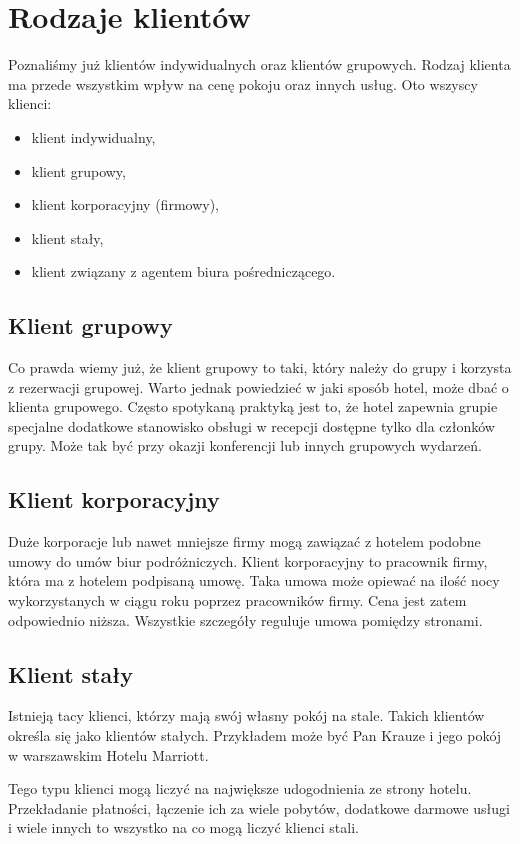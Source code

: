 \documentclass[a4paper,onecolumn,oneside,11pt,wide,floatssmall]{mwrep}
\theoremstyle{definition}
\theoremstyle{plain}%
\theoremstyle{remark}
\begin{document}
\section{Rodzaje klientów}
\label{rodzaje-klientow}
Poznaliśmy już klientów indywidualnych oraz klientów grupowych. Rodzaj 
klienta ma przede wszystkim wpływ na cenę pokoju oraz innych usług. Oto 
wszyscy klienci:

\begin{itemize}
  \item klient indywidualny,
  \item klient grupowy,
  \item klient korporacyjny (firmowy),
  \item klient stały,
  \item klient związany z agentem biura pośredniczącego.
\end{itemize}

\subsection{Klient grupowy}
Co prawda wiemy już, że klient grupowy to taki, który należy do grupy i 
korzysta z rezerwacji grupowej. Warto jednak powiedzieć w jaki sposób hotel, 
może dbać o klienta grupowego. Często spotykaną praktyką jest to, że hotel 
zapewnia grupie specjalne dodatkowe stanowisko obsługi w recepcji dostępne 
tylko dla członków grupy. Może tak być przy okazji konferencji lub innych 
grupowych wydarzeń.

\subsection{Klient korporacyjny}
Duże korporacje lub nawet mniejsze firmy mogą zawiązać z hotelem podobne 
umowy do umów biur podróżniczych. Klient korporacyjny to pracownik firmy, 
która ma z hotelem podpisaną umowę. Taka umowa może opiewać na ilość nocy 
wykorzystanych w ciągu roku poprzez pracowników firmy. Cena jest zatem 
odpowiednio niższa. Wszystkie szczegóły reguluje umowa pomiędzy stronami.

\subsection{Klient stały}
Istnieją tacy klienci, którzy mają swój własny pokój na stale. Takich 
klientów określa się jako klientów stałych. Przykładem może być Pan Krauze i 
jego pokój w warszawskim Hotelu Marriott.

Tego typu klienci mogą liczyć na największe udogodnienia ze strony hotelu. 
Przekładanie płatności, łączenie ich za wiele pobytów, dodatkowe darmowe 
usługi i wiele innych to wszystko na co mogą liczyć klienci stali.
\end{document}
